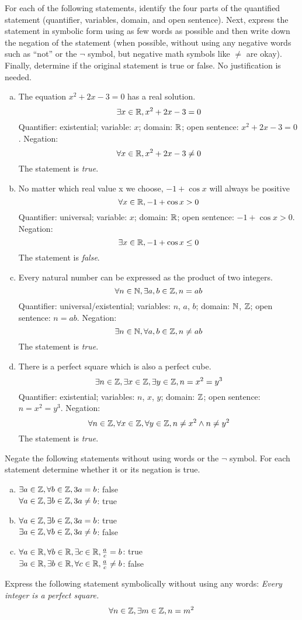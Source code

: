 \documentclass{agony}
\begin{document}
\question For each of the following statements, identify the four parts of the quantified statement
(quantifier, variables, domain, and open sentence).
Next, express the statement in symbolic form using as few words as possible and then write down the negation of the statement
(when possible, without using any negative words such as ``not'' or the $\lnot$ symbol, but negative math symbols like $\neq$ are okay).
Finally, determine if the original statement is true or false.
No justification is needed.
\begin{enumerate}[(a)]
  \item The equation $x^2+2x-3=0$ has a real solution.
        \[ \exists x\in\mathbb{R}, x^2+2x-3 = 0 \]
        Quantifier: existential;
        variable: $x$;
        domain: $\mathbb{R}$;
        open sentence: $x^2+2x-3=0$.
        Negation:
        \[ \forall x\in\mathbb{R}, x^2+2x-3 \neq 0 \]
        The statement is \emph{true}.
  \item No matter which real value x we choose, $-1 + \cos x$ will always be positive
        \[ \forall x\in\mathbb{R}, -1 + \cos x > 0 \]
        Quantifier: universal;
        variable: $x$;
        domain: $\mathbb{R}$;
        open sentence: $-1 + \cos x > 0$.
        Negation:
        \[ \exists x\in\mathbb{R}, -1 + \cos x \leq 0 \]
        The statement is \emph{false}.
  \item Every natural number can be expressed as the product of two integers.
        \[ \forall n\in\mathbb{N}, \exists a,b\in\mathbb{Z}, n = ab \]
        Quantifier: universal/existential;
        variables: $n$, $a$, $b$;
        domain: $\mathbb{N}$, $\mathbb{Z}$;
        open sentence: $n = ab$.
        Negation:
        \[ \exists n\in\mathbb{N}, \forall a,b\in\mathbb{Z}, n \neq ab \]
        The statement is \emph{true}.
  \item There is a perfect square which is also a perfect cube.
        \[ \exists n\in\mathbb{Z}, \exists x\in\mathbb{Z}, \exists y\in\mathbb{Z}, n=x^2=y^3 \]
        Quantifier: existential; variables: $n$, $x$, $y$; domain: $\mathbb{Z}$; open sentence: $n=x^2=y^3$.
        Negation:
        \[ \forall n\in\mathbb{Z}, \forall x\in\mathbb{Z}, \forall y\in\mathbb{Z}, n \neq x^2 \land n \neq y^2 \]
        The statement is \emph{true}.
\end{enumerate}


\question Negate the following statements without using words or the $\lnot$ symbol.
For each statement determine whether it or its negation is true.
\begin{enumerate}[(a)]
  \item $\exists a \in \mathbb{Z}, \forall b \in \mathbb{Z}, 3a=b$: false \\
        $\forall a \in \mathbb{Z}, \exists b \in \mathbb{Z}, 3a \neq b$: true
  \item $\forall a \in \mathbb{Z}, \exists b \in \mathbb{Z}, 3a=b$: true \\
        $\exists a \in \mathbb{Z}, \forall b \in \mathbb{Z}, 3a \neq b$: false
  \item $\forall a \in \mathbb{R}, \forall b \in \mathbb{R}, \exists c \in \mathbb{R}, \frac{a}{c}=b$: true \\
        $\exists a \in \mathbb{R}, \exists b \in \mathbb{R}, \forall c \in \mathbb{R}, \frac{a}{c} \neq b$: false
\end{enumerate}


\question Express the following statement symbolically without using any words:
\emph{Every integer is a perfect square.}
\[ \forall n\in\mathbb{Z}, \exists m\in\mathbb{Z}, n = m^2 \]
\end{document}
